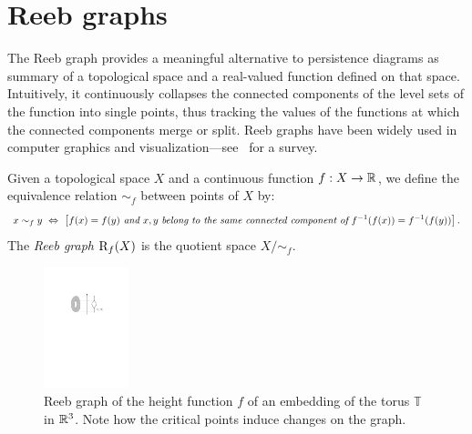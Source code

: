 \section{Reeb graphs}
\label{sec:reebgraph}



The Reeb graph provides a meaningful alternative to persistence diagrams as summary
of a topological space and a real-valued function defined on that space.
Intuitively, it continuously collapses the connected components of the level sets of the function into single points, thus tracking
the values of the functions at which the connected components merge or split.
Reeb graphs have been widely used in computer graphics and visualization---see~\cite{Biasotti08} for a survey. 
%
%
%
%
\begin{defin}
Given a topological space $X$ and a continuous function 
$f:X\rightarrow\mathbb{R}$, we define the equivalence relation $\sim_f$ between points of $X$ by:
%
\[
x\sim_f y\ \Leftrightarrow\ \left[ f(x)=f(y)\emph{ and }x,y\ \emph{belong to the same connected component of}\ f^{-1}(f(x))=f^{-1}(f(y))\right].
\]
%
The \emph{Reeb graph} $\mathrm{R}_f(X)$ is the quotient space $X/\sim_f$.
\end{defin}
%
\begin{figure}[htb] 
\begin{center}
\includegraphics[height = 3.5cm]{figures/ReebGraphTorus}\hspace{3mm}
\caption[Reeb graph on torus]{\label{fig:ReebGraphTorus} Reeb graph of the height function $f$ of an embedding of the torus $\mathbb T$ in $\mathbb{R}^3$. Note how the critical points induce
changes on the graph.}
\end{center} 
\end{figure}
